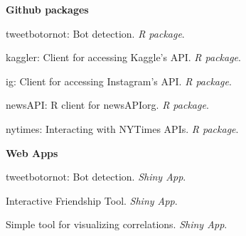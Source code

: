   \textbf{Github packages}
    \begin{innerlist}
      \item tweetbotornot: Bot detection. \textit{R package}. \href{https://github.com/mkearney/tweetbotornot}{\faExternalLink}
      \item kaggler: Client for accessing Kaggle’s API. \textit{R package}. \href{https://github.com/mkearney/kaggler}{\faExternalLink}
      \item ig: Client for accessing Instagram's API. \textit{R package}. \href{https://github.com/mkearney/ig}{\faExternalLink}
      \item newsAPI: R client for newsAPIorg. \textit{R package}. \href{https://github.com/mkearney/newsAPI}{\faExternalLink}
      \item nytimes: Interacting with NYTimes APIs. \textit{R package}. \href{https://github.com/mkearney/nytimes}{\faExternalLink}
    \end{innerlist}\vspace{1em}

  \textbf{Web Apps}
    \begin{innerlist}
      \item tweetbotornot: Bot detection. \textit{Shiny App}. \href{https://mikewk.shinyapps.io/botornot/}{\faExternalLink}
      \item Interactive Friendship Tool. \textit{Shiny App}. \href{https://mikewk.shinyapps.io/friendship/}{\faExternalLink}
      \item Simple tool for visualizing correlations. \textit{Shiny App}. \href{https://mikewk.shinyapps.io/correlation/}{\faExternalLink}
    \end{innerlist}

